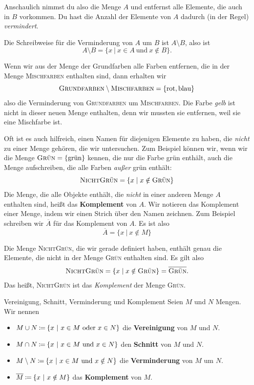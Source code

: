 \documentclass[../../main.tex]{subfiles}
\begin{document}
Anschaulich nimmst du also die Menge $A$ und entfernst alle Elemente, die auch in $B$ vorkommen. Du hast die Anzahl der Elemente von $A$ dadurch (in der Regel) \emph{vermindert}.

Die Schreibweise für die Verminderung von $A$ um $B$ ist $A\setminus B$, also ist
\[A\setminus B=\{x~|~x\in A~\text{und}~x\notin B\}.\]

\begin{example}{}
    Wenn wir aus der Menge der Grundfarben alle Farben entfernen, die in der Menge \textsc{Mischfarben} enthalten sind, dann erhalten wir
    \[\textsc{Grundfarben}\setminus\textsc{Mischfarben}=\{\text{rot},\text{blau}\}\]
    also die Verminderung von \textsc{Grundfarben} um \textsc{Mischfarben}. Die Farbe \emph{gelb} ist nicht in dieser neuen Menge enthalten, denn wir mussten sie entfernen, weil sie eine Mischfarbe ist.
\end{example}

Oft ist es auch hilfreich, einen Namen für diejenigen Elemente zu haben, die \emph{nicht} zu einer Menge gehören, die wir untersuchen. Zum Beispiel können wir, wenn wir die Menge $\textsc{Grün}=\{\text{grün}\}$ kennen, die nur die Farbe grün enthält, auch die Menge aufschreiben, die alle Farben \emph{außer} grün enthält:
\[\textsc{NichtGrün}=\{x\mid x\notin\textsc{Grün}\}\]
Die Menge, die alle Objekte enthält, die \emph{nicht} in einer anderen Menge $A$ enthalten sind, heißt das \textbf{Komplement} von $A$. Wir notieren das Komplement einer Menge, indem wir einen Strich über den Namen zeichnen. Zum Beispiel schreiben wir $\overline{A}$ für das Komplement von $A$. Es ist also
\[\overline{A}=\{x~|~x\notin M\}\]

\begin{example}{}
    Die Menge \textsc{NichtGrün}, die wir gerade definiert haben, enthält genau die Elemente, die nicht in der Menge \textsc{Grün} enthalten sind. Es gilt also
    \[\textsc{NichtGrün}=\{x\mid x\notin\textsc{Grün}\}=\overline{\textsc{Grün}}.\]
    Das heißt, \textsc{NichtGrün} ist das \emph{Komplement} der Menge \textsc{Grün}.
\end{example}

\begin{definition}{Vereinigung, Schnitt, Verminderung und Komplement}
    Seien $M$ und $N$ Mengen. Wir nennen
    \begin{itemize}
        \item $M\cup N\mathbin{\coloneqq}\{x~|~x\in M~\text{oder}~x\in N\}$ die \textbf{Vereinigung} von $M$ und $N$.
        \item $M\cap N\mathbin{\coloneqq}\{x~|~x\in M~\text{und}~x\in N\}$ den \textbf{Schnitt} von $M$ und $N$.
        \item $M\setminus N\mathbin{\coloneqq}\{x~|~x\in M~\text{und}~x\notin N\}$ die \textbf{Verminderung} von $M$ um $N$.
        \item $\overline{M}\mathbin{\coloneqq}\{x~|~x\notin M\}$ das \textbf{Komplement} von $M$.
    \end{itemize}
\end{definition}
\end{document}
